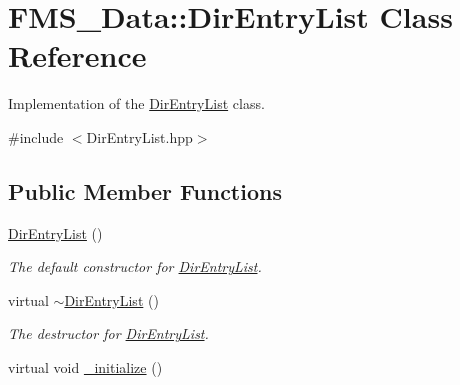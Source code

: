 \hypertarget{classFMS__Data_1_1DirEntryList}{
\section{FMS\_\-Data::DirEntryList Class Reference}
\label{classFMS__Data_1_1DirEntryList}
}


Implementation of the \hyperlink{classFMS__Data_1_1DirEntryList}{DirEntryList} class.  




{\ttfamily \#include $<$DirEntryList.hpp$>$}

\subsection*{Public Member Functions}
\begin{DoxyCompactItemize}
\item 
\hypertarget{classFMS__Data_1_1DirEntryList_a47148b88903789e4273d699b4152c02d}{
\hyperlink{classFMS__Data_1_1DirEntryList_a47148b88903789e4273d699b4152c02d}{DirEntryList} ()}
\label{classFMS__Data_1_1DirEntryList_a47148b88903789e4273d699b4152c02d}

\begin{DoxyCompactList}\small\item\em The default constructor for \hyperlink{classFMS__Data_1_1DirEntryList}{DirEntryList}. \item\end{DoxyCompactList}\item 
\hypertarget{classFMS__Data_1_1DirEntryList_ab5f6797787e35f01140a1381de79f2fe}{
virtual \hyperlink{classFMS__Data_1_1DirEntryList_ab5f6797787e35f01140a1381de79f2fe}{$\sim$DirEntryList} ()}
\label{classFMS__Data_1_1DirEntryList_ab5f6797787e35f01140a1381de79f2fe}

\begin{DoxyCompactList}\small\item\em The destructor for \hyperlink{classFMS__Data_1_1DirEntryList}{DirEntryList}. \item\end{DoxyCompactList}\item 
\hypertarget{classFMS__Data_1_1DirEntryList_af96c49c6be35a9aa6b4bed25d830a4a3}{
virtual void \hyperlink{classFMS__Data_1_1DirEntryList_af96c49c6be35a9aa6b4bed25d830a4a3}{\_\-initialize} ()}
\label{classFMS__Data_1_1DirEntryList_af96c49c6be35a9aa6b4bed25d830a4a3}


\end{DoxyCompactItemize}
